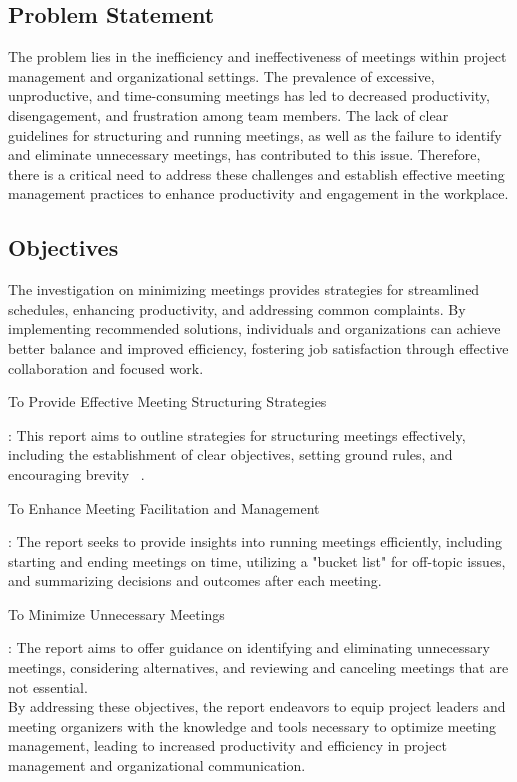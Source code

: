 \subsection{Problem Statement}
The problem lies in the inefficiency and ineffectiveness of meetings within project management and organizational settings. The prevalence of excessive, unproductive, and time-consuming meetings has led to decreased productivity, disengagement, and frustration among team members. The lack of clear guidelines for structuring and running meetings, as well as the failure to identify and eliminate unnecessary meetings, has contributed to this issue. Therefore, there is a critical need to address these challenges and establish effective meeting management practices to enhance productivity and engagement in the workplace.
\subsection{Objectives}
The investigation on minimizing meetings provides strategies for streamlined schedules, enhancing productivity, and addressing common complaints. By implementing recommended solutions, individuals and organizations can achieve better balance and improved efficiency, fostering job satisfaction through effective collaboration and focused work.
\begin{enumerate}
{\bfseries \item To Provide Effective Meeting Structuring Strategies}: This report aims to outline strategies for structuring meetings effectively, including the establishment of clear objectives, setting ground rules, and encouraging brevity ~\cite{04}.
{\bfseries \item  To Enhance Meeting Facilitation and Management}: The report seeks to provide insights into running meetings efficiently, including starting and ending meetings on time, utilizing a "bucket list" for off-topic issues, and summarizing decisions and outcomes after each meeting.
{\bfseries \item  To Minimize Unnecessary Meetings}: The report aims to offer guidance on identifying and eliminating unnecessary meetings, considering alternatives, and reviewing and canceling meetings that are not essential.\\
By addressing these objectives, the report endeavors to equip project leaders and meeting organizers with the knowledge and tools necessary to optimize meeting management, leading to increased productivity and efficiency in project management and organizational communication.
\end{enumerate}
